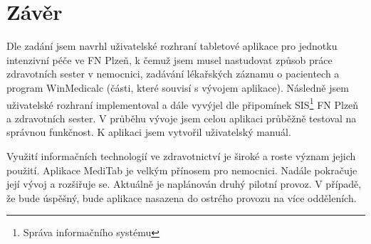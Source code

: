 \setlength{\parskip}{1em}

\chapter*{Závěr}

Dle zadání jsem navrhl uživatelské rozhraní tabletové aplikace pro jednotku intenzivní péče ve FN Plzeň, k čemuž jsem musel nastudovat způsob práce zdravotních sester v nemocnici, zadávání lékařských záznamu o pacientech a program WinMedicalc (části, které souvisí s vývojem aplikace). Následně jsem uživatelské rozhraní implementoval a dále vyvýjel dle připomínek SIS\footnote{Správa informačního systému} FN Plzeň a zdravotních sester. V průběhu vývoje jsem celou aplikaci průběžně testoval na správnou funkčnost. K aplikaci jsem vytvořil uživatelský manuál.

Využití informačních technologií ve zdravotnictví je široké a roste význam jejich použití. Aplikace MediTab je velkým přínosem pro nemocnici. Nadále pokračuje její vývoj a rozšiřuje se. Aktuálně je naplánován druhý pilotní provoz. V případě, že bude úspěšný, bude aplikace nasazena do ostrého provozu na více odděleních.